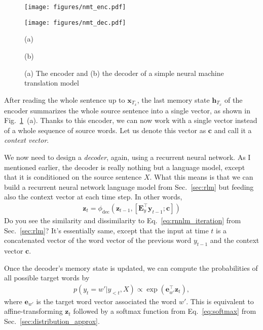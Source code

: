 \documentclass{report}
\newcommand{\vect}[1]{\mathbf{#1}}
\newcommand{\matr}[1]{\mathbf{#1}}
\newcommand{\vc}[0]{\vect{c}}
\newcommand{\ve}[0]{\vect{e}}
\newcommand{\vh}[0]{\vect{h}}
\newcommand{\vx}[0]{\vect{x}}
\newcommand{\vz}[0]{\vect{z}}
\newcommand{\vy}[0]{\vect{y}}
\newcommand{\mE}[0]{\matr{E}}
\newcommand{\dec}{\text{dec}}
\begin{document}
\begin{figure}[t]
    \centering
    \begin{minipage}{0.48\textwidth}
        \centering
        \texttt{[image: figures/nmt\_enc.pdf]}
    \end{minipage}
    \hfill
    \begin{minipage}{0.48\textwidth}
        \centering
        \texttt{[image: figures/nmt\_dec.pdf]}
    \end{minipage}

    \begin{minipage}{0.48\textwidth}
        \centering
        (a)
    \end{minipage}
    \hfill
    \begin{minipage}{0.48\textwidth}
        \centering
        (b)
    \end{minipage}
    \caption{(a) The encoder and (b) the decoder of a simple neural machine
    translation model}
    \label{fig:nmt}
\end{figure}

After reading the whole sentence up to $\vx_{T_x}$, the last memory state
$\vh_{T_x}$ of the encoder summarizes the whole source sentence into a single
vector, as shown in Fig.~\ref{fig:nmt}~(a). Thanks to this encoder, we can now
work with a single vector instead of a whole sequence of source words. Let us
denote this vector as $\vc$ and call it a {\em context vector}.

We now need to design a {\em decoder}, again, using a recurrent neural network.
As I mentioned earlier, the decoder is really nothing but a language model,
except that it is conditioned on the source sentence $X$. What this means is
that we can build a recurrent neural network language model from
Sec.~\ref{sec:rlm} but feeding also the context vector at each time step. In
other words,
\begin{align}
    \label{eq:nmt_decoder}
    \vz_t = \phi_{\dec}\left( \vz_{t-1}, \left[ \mE_y^\top \vy_{t-1}; \vc
    \right]\right)
\end{align}
Do you see the similarity and dissimilarity to Eq.~\eqref{eq:rnnlm_iteration}
from Sec.~\ref{sec:rlm}? It's essentially same, except that the input at time $t$
is a concatenated vector of the word vector of the previous word $y_{t-1}$ and
the context vector $\vc$.

Once the decoder's memory state is updated, we can compute the probabilities of
all possible target words by
\begin{align}
    \label{eq:nmt_decoder_out}
    p(y_t = w'|y_{<t}, X) \propto \exp\left( \ve_{w'}^\top \vz_t \right),
\end{align}
where $\ve_{w'}$ is the target word vector associated the word $w'$. This is
equivalent to affine-transforming $\vz_t$ followed by a softmax function from
Eq.~\eqref{eq:softmax} from Sec.~\ref{sec:distribution_approx}.
\end{document}
